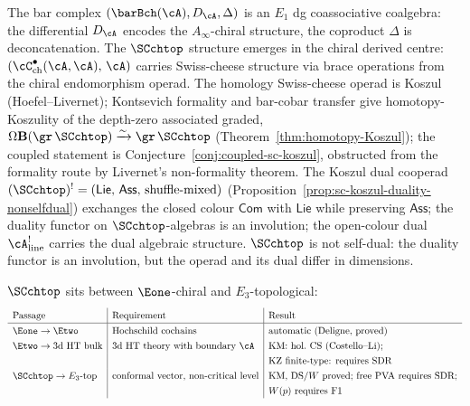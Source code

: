 The bar complex $(\barBch(\cA), D_\cA, \Delta)$ is an $E_1$ dg
coassociative coalgebra: the differential $D_\cA$ encodes the
$A_\infty$-chiral structure, the coproduct $\Delta$ is
deconcatenation. The $\SCchtop$ structure emerges in the chiral
derived centre: $(\cC^\bullet_{\mathrm{ch}}(\cA,\cA),\,\cA)$
carries Swiss-cheese structure via brace operations from the
chiral endomorphism operad. The homology Swiss-cheese operad
is Koszul (Hoefel--Livernet); Kontsevich formality and bar-cobar
transfer give homotopy-Koszulity of the depth-zero associated
graded,
$\Omega\mathbf{B}(\gr\,\SCchtop) \xrightarrow{\sim} \gr\,\SCchtop$
(Theorem~\ref{thm:homotopy-Koszul}); the coupled statement is
Conjecture~\ref{conj:coupled-sc-koszul}, obstructed from the
formality route by Livernet's non-formality theorem. The Koszul dual cooperad
$(\SCchtop)^! = (\mathsf{Lie},\, \mathsf{Ass},\,
\text{shuffle-mixed})$
(Proposition~\ref{prop:sc-koszul-duality-nonselfdual}) exchanges the closed
colour $\mathsf{Com}$ with $\mathsf{Lie}$ while preserving
$\mathsf{Ass}$; the duality functor on $\SCchtop$-algebras is
an involution; the open-colour dual $\cA^!_{\mathrm{line}}$
carries the dual algebraic structure. $\SCchtop$ is not self-dual: the duality functor is an
involution, but the operad and its dual differ in dimensions.

$\SCchtop$ sits between $\Eone$-chiral and $E_3$-topological:
\[
\renewcommand{\arraystretch}{1.3}
\begin{array}{l|l|l}
\text{Passage} & \text{Requirement} & \text{Result} \\
\hline
\Eone \to \Etwo & \text{Hochschild cochains} &
 \text{automatic (Deligne, proved)} \\
\Etwo \to \text{3d HT bulk} &
 \text{3d HT theory with boundary } \cA &
 \text{KM: hol.~CS (Costello--Li);} \\
 & & \text{KZ finite-type: requires SDR} \\
\SCchtop \to E_3\text{-top} &
 \text{conformal vector, non-critical level} &
 \text{KM, DS/}W\text{ proved; free PVA requires SDR;} \\
 & & W(p) \text{ requires F1}
\end{array}
\]

